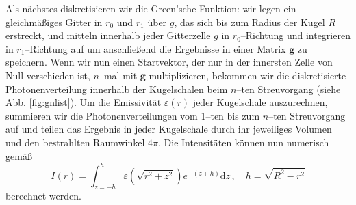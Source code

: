 	Als nächstes diskretisieren wir die Green'sche Funktion: wir legen ein gleichmäßiges Gitter in $r_0$ und $r_1$ über $g$, das sich bis zum Radius der Kugel $R$ erstreckt, und mitteln innerhalb jeder Gitterzelle $g$ in $r_0$--Richtung und integrieren in $r_1$--Richtung auf um anschließend die Ergebnisse in einer Matrix $\mathbf{g}$ zu speichern. Wenn wir nun einen Startvektor, der nur in der innersten Zelle von Null verschieden ist, $n$--mal mit $\mathbf{g}$ multiplizieren, bekommen wir die diskretisierte Photonenverteilung innerhalb der Kugelschalen beim $n$--ten Streuvorgang (siehe Abb. \ref{fig:gnlist}). Um die Emissivität $\varepsilon(r)$ jeder Kugelschale auszurechnen, summieren wir die Photonenverteilungen vom 1--ten bis zum $n$--ten Streuvorgang auf und teilen das Ergebnis in jeder Kugelschale durch ihr jeweiliges Volumen und den bestrahlten Raumwinkel $4\pi$. Die Intensitäten können nun numerisch gemäß
	\begin{equation}
		I(r) = \int_{z=-h}^h \varepsilon\left(\sqrt{r^2+z^2}\right) e^{-(z+h)}\text{d}z\,,\quad h=\sqrt{R^2-r^2}
		\label{eq:testprob_intensity_calculation}
	\end{equation}
	berechnet werden.
	
	
	
	\vfill
	\pagebreak
